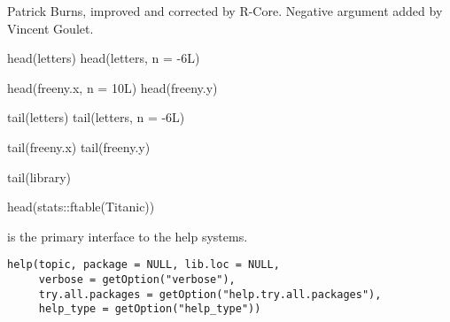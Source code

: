 %
\begin{Author}\relax
Patrick Burns, improved and corrected by R-Core. Negative argument
added by Vincent Goulet.
\end{Author}
%
\begin{Examples}
\begin{ExampleCode}
head(letters)
head(letters, n = -6L)

head(freeny.x, n = 10L)
head(freeny.y)

tail(letters)
tail(letters, n = -6L)

tail(freeny.x)
tail(freeny.y)

tail(library)

head(stats::ftable(Titanic))
\end{ExampleCode}
\end{Examples}
%
\begin{Description}\relax
{} is the primary interface to the help systems.
\end{Description}
%
\begin{Usage}
\begin{verbatim}
help(topic, package = NULL, lib.loc = NULL,
     verbose = getOption("verbose"),
     try.all.packages = getOption("help.try.all.packages"),
     help_type = getOption("help_type"))
\end{verbatim}
\end{Usage}
%

